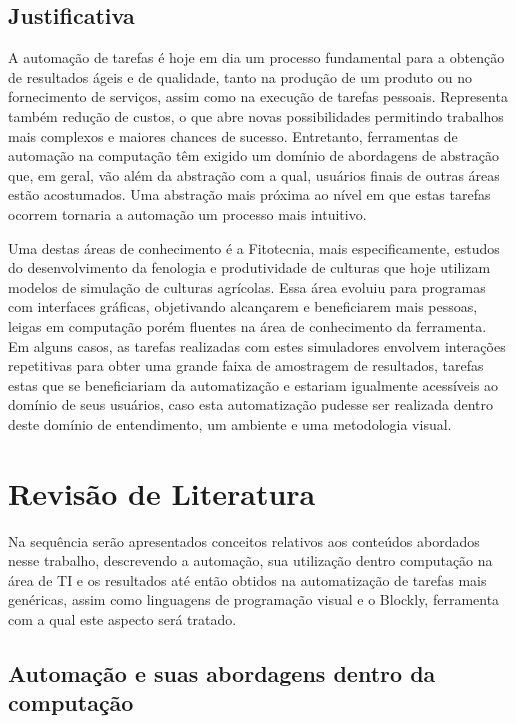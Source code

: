 \documentclass[tg]{mdtufsm}
\begin{document}
    	\section{Justificativa}

            A automação de tarefas é hoje em dia um processo fundamental para a obtenção de resultados ágeis e de qualidade, tanto na produção de um produto ou no fornecimento de serviços, assim como na execução de tarefas pessoais. Representa também redução de custos, o que abre novas possibilidades permitindo trabalhos mais complexos e maiores chances de sucesso. Entretanto, ferramentas de automação na computação têm exigido um domínio de abordagens de abstração que, em geral, vão além da abstração com a qual, usuários finais de outras áreas estão acostumados. Uma abstração mais próxima ao nível em que estas tarefas ocorrem tornaria a automação um processo mais intuitivo.

        	Uma destas áreas de conhecimento é a Fitotecnia, mais especificamente, estudos do desenvolvimento da fenologia e produtividade de culturas que hoje utilizam modelos de simulação de culturas agrícolas. Essa área evoluiu para programas com interfaces gráficas, objetivando alcançarem e beneficiarem mais pessoas, leigas em computação porém fluentes na área de conhecimento da ferramenta. Em alguns casos, as tarefas realizadas com estes simuladores envolvem interações repetitivas para obter uma grande faixa de amostragem de resultados, tarefas estas que se beneficiariam da automatização e estariam igualmente acessíveis ao domínio de seus usuários, caso esta automatização pudesse ser realizada dentro deste domínio de entendimento, um ambiente e uma metodologia visual.

	\chapter{Revisão de Literatura}
    	Na sequência serão apresentados conceitos relativos aos conteúdos abordados nesse trabalho, descrevendo a automação, sua utilização dentro computação na área de TI e os resultados até então obtidos na automatização de tarefas mais genéricas, assim como linguagens de programação visual e o Blockly, ferramenta com a qual este aspecto será tratado.

    	\section{Automação e suas abordagens dentro da computação}
\end{document}
